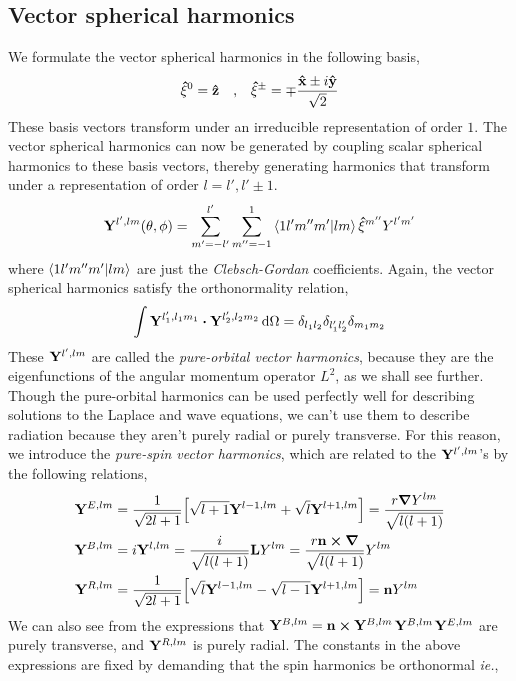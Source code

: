 \documentclass[a4paper,11pt]{article}
\begin{document}
\subsection{Vector spherical harmonics}
We formulate the vector spherical harmonics in the following basis,
\begin{equation*}
\vu{\xi}^0 = \vu{z} \qq{,} \vu{\xi}^\pm = \mp \dfrac{\vu{x} \pm i \vu{y}}{\sqrt{2}}
\end{equation*}
These basis vectors transform under an irreducible representation of order $ 1 $. The vector spherical harmonics can now be generated by coupling scalar spherical harmonics to these basis vectors, thereby generating harmonics that transform under a representation of order $ l = l', l'\pm 1 $.
\begin{equation*}
\vb{Y}^{l',lm} (\theta, \phi) = \sum_{m'=-l'}^{l'} \sum_{m''=-1}^{1} \ip{1 l' m'' m'}{lm} \vu{\xi}^{m''} Y^{l'm'}
\end{equation*}
where $ \ip{1 l' m'' m'}{lm}  $ are just the \textit{Clebsch-Gordan} coefficients. Again, the vector spherical harmonics satisfy the orthonormality relation,
\begin{equation*}
\int \vb{Y}^{l'_1,l_1m_1} \vdot \vb{Y}^{l'_2,l_2m_2} \dd{\Omega} = \delta_{l_1l_2} \delta_{l'_1l'_2} \delta_{m_1m_2}
\end{equation*}
These $ \vb{Y}^{l',lm}  $ are called the \textit{pure-orbital vector harmonics}, because they are the eigenfunctions of the angular momentum operator $ L^2 $, as we shall see further. Though the pure-orbital harmonics can be used perfectly well for describing solutions to the Laplace and wave equations, we can't use them to describe radiation because they aren't purely radial or purely transverse. For this reason, we introduce the \textit{pure-spin vector harmonics}, which are related to the $  \vb{Y}^{l',lm} $'s by the following relations, 	
\begin{align*}
\vb{Y}^{E,lm} &= \dfrac{1}{\sqrt{2 l + 1}} \qty[\sqrt{l+1} \vb{Y}^{l-1,lm}  + \sqrt{l} \vb{Y}^{l+1,lm} ] = \dfrac{r \grad{Y^{lm}}}{\sqrt{l(l + 1)}}\\
\vb{Y}^{B,lm} &= i \vb{Y}^{l,lm} = \dfrac{i}{\sqrt{l(l + 1)}} \vb{L} Y^{lm} =  \dfrac{ r \vb{n} \cross \grad}{\sqrt{l(l + 1)}}  Y^{lm}\\
\vb{Y}^{R,lm} &= \dfrac{1}{\sqrt{2 l + 1}} \qty[\sqrt{l} \vb{Y}^{l-1,lm}  - \sqrt{l-1} \vb{Y}^{l+1,lm} ] = \vb{n} Y^{lm}
\end{align*}
We can also see from the expressions that $ \vb{Y}^{B,lm} = \vb{n} \cross \vb{Y}^{B,lm} $$ \vb{Y}^{B,lm} $$ \vb{Y}^{E,lm} $ are purely transverse, and $ \vb{Y}^{R,lm} $ is purely radial. The constants in the above expressions are fixed by demanding that the spin harmonics be orthonormal \textit{ie.},
\end{document}
